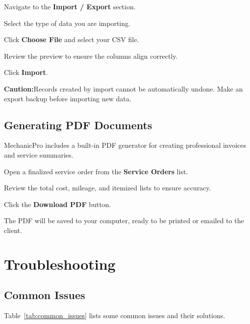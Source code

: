 \documentclass[12pt, a4paper]{report}
\newcommand{\dangerbox}[1]{%
	\vspace{6pt}
	\noindent
	\colorbox{DangerRed}{%
		\begin{minipage}{\dimexpr\linewidth-2\fboxsep}%
			\vspace{5pt}
			\small\textbf{\color{DangerBorder}Caution:\space}\color{Navy}#1
			\vspace{5pt}
		\end{minipage}%
	}
	\vspace{6pt}
}
\newcommand{\ui}[1]{\textbf{\color{Navy}#1}}
\begin{document}
	\begin{steps}
		\item Navigate to the \ui{Import / Export} section.
		\item Select the type of data you are importing.
		\item Click \ui{Choose File} and select your CSV file.
		\item Review the preview to ensure the columns align correctly.
		\item Click \ui{Import}.
	\end{steps}
	
	\dangerbox{Records created by import cannot be automatically undone.
		Make an export backup before importing new data.}
	
	\section{Generating PDF Documents}
	MechanicPro includes a built-in PDF generator for creating professional invoices and service summaries.
	
	\begin{steps}
		\item Open a finalized service order from the \ui{Service Orders} list.
		\item Review the total cost, mileage, and itemized lists to ensure accuracy.
		\item Click the \ui{Download PDF} button.
		\item The PDF will be saved to your computer, ready to be printed or emailed to the client.
	\end{steps}
	
	\chapter{Troubleshooting}
	
	\section{Common Issues}
	
	Table~\ref{tab:common_issues} lists some common issues and their solutions.
\end{document}

